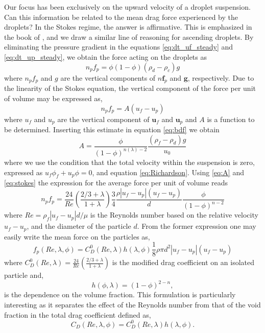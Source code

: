 Our focus has been exclusively on the upward velocity of a droplet suspension. 
Can this information be related to the mean drag force experienced by the droplets? In the Stokes regime, the answer is affirmative. This is emphasized in the book of \citep{jackson2000}, and we draw a similar line of reasoning for ascending droplets. By eliminating the pressure gradient in the equations \ref{eq:dt_uf_steady} and \ref{eq:dt_up_steady}, we obtain the force acting on the droplets as
\begin{equation}
n_pf_p = \phi(1-\phi)(\rho_d -\rho _c)g
\label{eq:bdf}
\end{equation}
where $n_pf_p$ and $g$ are the vertical components of $n\textbf{f}_p$ and $\textbf{g}$, respectively. 
Due to the linearity of the Stokes equation, the vertical component of the force per unit of volume may be expressed as, 
\begin{equation}
    n_pf_p = A (u_f -u_p)
    \label{eq:stokes}
\end{equation}
where $u_f$ and $u_p$ are the vertical component of $\textbf{u}_f$ and $\textbf{u}_p$ and $A$ is a function to be determined. 
Inserting this estimate in equation \ref{eq:bdf} we obtain 
\begin{equation}
    A = \frac{\phi}{(1-\phi)^{n(\lambda)-2}} \frac{(\rho_f -\rho_d)g}{u_0} 
    \label{eq:A}
\end{equation}
where we use the condition that the total velocity within the suspension is zero, expressed as $u_f \phi_f + u_p \phi =0$, and equation \ref{eq:Richardson}. 
Using \ref{eq:A} and \ref{eq:stokes} the expression for the average force per unit of volume reads
\begin{equation}
n_pf_p = \frac{24}{Re}\left(\frac{2/3+\lambda}{1+\lambda}\right)\frac{3}{4}\frac{\rho |u_f-u_p|(u_f-u_p)}{d}\frac{\phi}{(1-\phi)^{n-2}}
\end{equation}
where $Re = \rho_f |u_f-u_p| d/\mu$ is the Reynolds number based on the relative velocity $u_f-u_p$, and the diameter of the particle $d$. 
From the former expression one may easily write the mean force on the particles as,
\begin{equation}
f_p (Re,\lambda,\phi) = C_D^0(Re,\lambda)h(\lambda,\phi)\frac{1}{8}\rho \pi d^2 |u_f-u_p|(u_f-u_p)
\label{eq:FCD}
\end{equation}
where $C_D^0(Re,\lambda)=\frac{24}{Re}\left(\frac{2/3+\lambda}{1+\lambda}\right)$ is the modified drag coefficient on an isolated particle and,
\begin{equation}
    h(\phi,\lambda) = (1-\phi)^{2-n},
    \label{eq:h_stokes}
\end{equation} 
is the dependence on the volume fraction. 
This formulation is particularly interesting as it separates the effect of the Reynolds number from that of the void fraction in the total drag coefficient defined as,
\begin{equation}
    C_D(Re,\lambda,\phi) = C_D^0(Re,\lambda)h(\lambda,\phi).
    \label{eq:C_d_final}
\end{equation}

